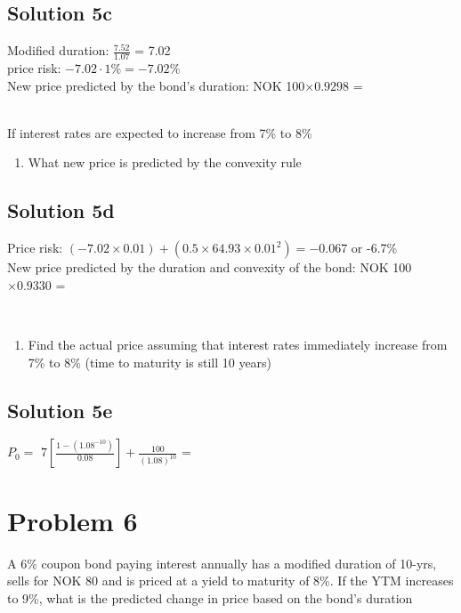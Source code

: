 \documentclass[12]{article}
\begin{document}
\color{blue}
\subsection*{Solution 5c}
Modified duration: {\Large $\frac{7.52}{1.07}$} = 7.02\\
price risk: $-7.02 \cdot 1\% = -7.02\%$ \\
New price predicted by the bond's duration: NOK 100$ \times 0.9298$ = 


\noindent
\\
\color{black}
If interest rates are expected to increase from 7\% to 8\% 
\begin{enumerate} 
    \item[d)] What new price is predicted by the convexity rule 
\end{enumerate}

\color{blue}
\subsection*{Solution 5d}
Price risk: $(-7.02 \times 0.01) + (0.5 \times 64.93 \times 0.01^2) = -0.067$ or -6.7\% \\
New price predicted by the duration and convexity of the bond: NOK 100$ \times 0.9330$ = 





\noindent
\\
\color{black}
\begin{enumerate}
    \item[e)] Find the actual price assuming that interest rates immediately increase from 7\% to 8\% (time to maturity is still  10 years) 
\end{enumerate}

\color{blue}
\subsection*{Solution 5e}
$P_0 = $ {\Large $7[\frac{1 - (1.08^{-10})}{0.08}] + \frac{100}{(1.08)^{10}}$} = \\




\color{black}
\section*{Problem 6}
A 6\% coupon bond paying interest annually has a modified duration of 10-yrs, sells for NOK 80 and is priced at a yield to maturity of 8\%. If the YTM increases to 9\%, what is the predicted change in price based on the bond's duration
\end{document}
